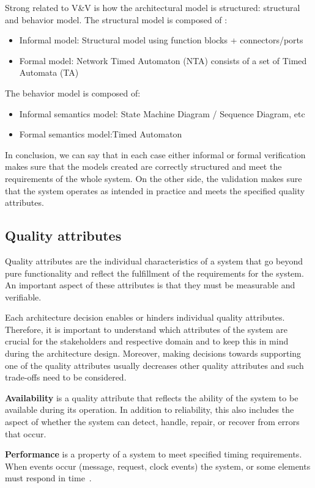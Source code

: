 \documentclass[conference]{IEEEtran}
\begin{document}
Strong related to V\&V is how the architectural model is structured: structural and behavior model. The structural model is composed of : 
\begin{itemize}
    \item Informal model: Structural model using function blocks + connectors/ports
    \item Formal model: Network Timed Automaton (NTA) consists of a set of Timed Automata (TA)
\end{itemize}
The behavior model is composed of:
\begin{itemize}
    \item Informal semantics model: State Machine Diagram / Sequence Diagram, etc
    \item Formal semantics model:Timed Automaton
    \cite{b21}
\end{itemize}

In conclusion, we can say that in each case either informal or formal verification makes sure that the models created are correctly structured and meet the requirements of the whole system. On the other side, the validation makes sure that the system operates as intended in practice and meets the specified quality attributes.


\subsection{Quality attributes}
Quality attributes are the individual characteristics of a system that go beyond pure functionality and reflect the fulfillment of the requirements for the system. An important aspect of these attributes is that they must be measurable and verifiable.

Each architecture decision enables or hinders individual quality attributes. Therefore, it is important to understand which attributes of the system are crucial for the stakeholders and respective domain and to keep this in mind during the architecture design. Moreover, making decisions towards supporting one of the quality attributes usually decreases other quality attributes and such trade-offs need to be considered.

\textbf{Availability} is a quality attribute that reflects the ability of the system to be available during its operation. In addition to reliability, this also includes the aspect of whether the system can detect, handle, repair, or recover from errors that occur.

\textbf{Performance} is a property of a system to meet specified timing requirements. When events occur (message, request, clock events) the system, or some elements must respond in time~\cite{b1}.
\end{document}
